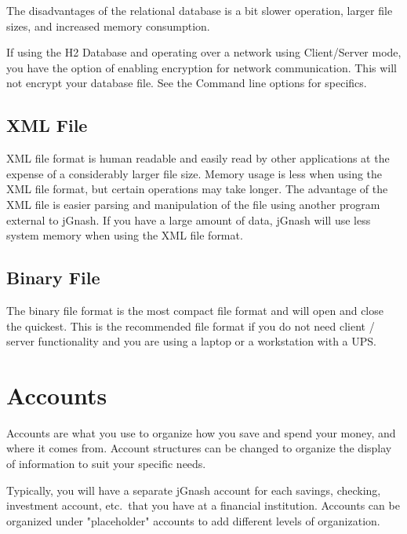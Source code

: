\documentclass[letterpaper,12pt]{book}
\begin{document}
    The disadvantages of the relational database is a bit slower operation, larger file sizes, and increased memory consumption.

    If using the H2 Database and operating over a network using Client/Server mode, you have the option of enabling
    encryption for network communication.
    This will not encrypt your database file.
    See the Command line options for specifics.


    \subsection{XML File}\label{subsec:xml-file}
    XML file format is human readable and easily read by other applications at the expense of a considerably larger file size.
    Memory usage is less when using the XML file format, but certain operations may take longer.
    The advantage of the XML file is easier parsing and manipulation of the file using another program external to jGnash.
    If you have a large amount of data, jGnash will use less system memory when using the XML file format.



    \subsection{Binary File}\label{subsec:binary-file}
    The binary file format is the most compact file format and will open and close the quickest.
    This is the recommended file format if you do not need client / server functionality and you are using a laptop
    or a workstation with a UPS\@.

    \newpage
    \section{Accounts}\label{sec:accounts}
    Accounts are what you use to organize how you save and spend your money, and where it comes from.
    Account structures can be changed to organize the display of information to suit your specific needs.

    Typically, you will have a separate jGnash account for each savings, checking, investment account, etc.\
    that you have at a financial institution.
    Accounts can be organized under "placeholder" accounts to add different levels of organization.
\end{document}
